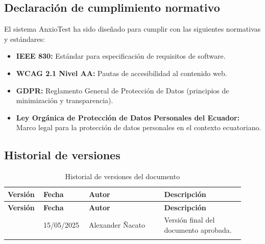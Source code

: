 \subsection{Declaración de cumplimiento normativo}
\label{sec:cumplimiento_normativo}

El sistema AnxioTest ha sido diseñado para cumplir con las siguientes normativas y estándares:

\begin{itemize}
  \item \textbf{IEEE 830:} Estándar para especificación de requisitos de software.
  \item \textbf{WCAG 2.1 Nivel AA:} Pautas de accesibilidad al contenido web.
  \item \textbf{GDPR:} Reglamento General de Protección de Datos (principios de minimización y transparencia).
  \item \textbf{Ley Orgánica de Protección de Datos Personales del Ecuador:} Marco legal para la protección de datos personales en el contexto ecuatoriano.
\end{itemize}

\subsection{Historial de versiones}
\label{sec:historial_versiones}

\begin{longtable}{p{0.12\linewidth} p{0.18\linewidth} p{0.30\linewidth} p{0.32\linewidth}}
\toprule
\rowcolor{tableheader!20}
\textbf{Versión} & \textbf{Fecha} & \textbf{Autor} & \textbf{Descripción} \\
\midrule
\endfirsthead
\rowcolor{tableheader!20}
\textbf{Versión} & \textbf{Fecha} & \textbf{Autor} & \textbf{Descripción} \\
\midrule
\endhead
\bottomrule
\endfoot
1.0 & 15/05/2025 & Alexander Ñacato & Versión final del documento aprobada. \\
\bottomrule
\caption{Historial de versiones del documento}
\label{tab:historial}
\end{longtable}